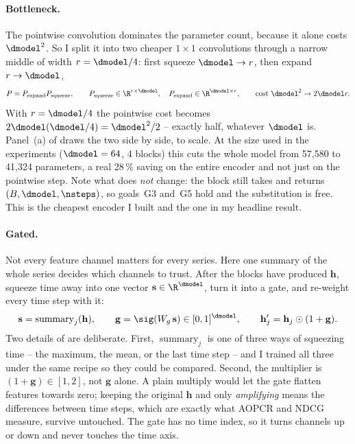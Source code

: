 \paragraph{Bottleneck.}
The pointwise convolution dominates the parameter count, because it alone costs $\dmodel^2$. So I
split it into two cheaper $1\times1$ convolutions through a narrow middle of width
$r = \dmodel / 4$: first squeeze $\dmodel \to r$, then expand $r \to \dmodel$,
\begin{equation}
  P = P_{\text{expand}} P_{\text{squeeze}}, \qquad
  P_{\text{squeeze}} \in \R^{r \times \dmodel}, \quad
  P_{\text{expand}} \in \R^{\dmodel \times r},
  \qquad \text{cost } \dmodel^2 \rightarrow 2\dmodel r .
  \label{eq:bottleneck}
\end{equation}
With $r = \dmodel/4$ the pointwise cost becomes $2\dmodel(\dmodel/4) = \dmodel^2/2$ -- exactly half,
whatever $\dmodel$ is. Panel~(a) of  draws the two side by side, to scale. At the
size used in the experiments ($\dmodel = 64$, 4 blocks) this cuts the whole model from 57{,}580 to
41{,}324 parameters, a real 28\,\% saving on the entire encoder and not just on the pointwise step.
Note what does \emph{not} change: the block still takes and returns $(B, \dmodel, \nsteps)$, so
goals~G3 and~G5 hold and the substitution is free. This is the cheapest encoder I built and the one
in my headline result.

\paragraph{Gated.}
Not every feature channel matters for every series. Here one summary of the whole series decides
which channels to trust. After the blocks have produced $\mathbf{h}$, squeeze time away into one
vector $\mathbf{s} \in \R^{\dmodel}$, turn it into a gate, and re-weight every time step with it:
\begin{equation}
  \mathbf{s} = \operatorname{summary}_j(\mathbf{h}) ,
  \qquad
  \mathbf{g} = \sig(W_g\,\mathbf{s}) \in [0,1]^{\dmodel} ,
  \qquad
  \mathbf{h}'_j = \mathbf{h}_j \odot (1 + \mathbf{g}) .
  \label{eq:gate}
\end{equation}
Two details of  are deliberate. First, $\operatorname{summary}_j$ is one of three ways
of squeezing time -- the maximum, the mean, or the last time step -- and I trained all three under
the same recipe so they could be compared. Second, the multiplier is $(1 + \mathbf{g}) \in [1,2]$,
not $\mathbf{g}$ alone. A plain multiply would let the gate flatten features towards zero; keeping
the original $\mathbf{h}$ and only \emph{amplifying} means the differences between time steps, which
are exactly what AOPCR and NDCG measure, survive untouched. The gate has no time index, so it turns
channels up or down and never touches the time axis.

